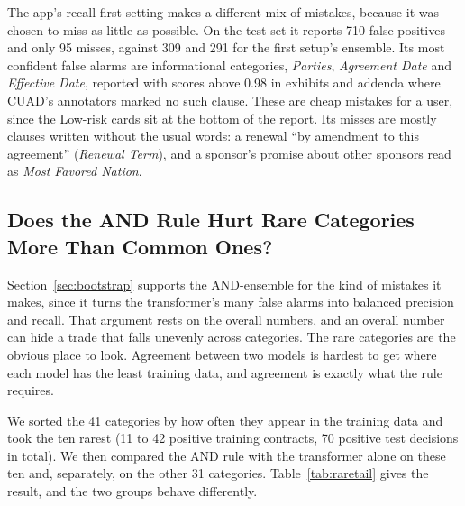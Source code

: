 The app's recall-first setting makes a different mix of mistakes, because it was chosen to miss as little as possible. On the test set it reports 710 false positives and only 95 misses, against 309 and 291 for the first setup's ensemble. Its most confident false alarms are informational categories, \emph{Parties}, \emph{Agreement Date} and \emph{Effective Date}, reported with scores above 0.98 in exhibits and addenda where CUAD's annotators marked no such clause. These are cheap mistakes for a user, since the Low-risk cards sit at the bottom of the report. Its misses are mostly clauses written without the usual words: a renewal ``by amendment to this agreement'' (\emph{Renewal Term}), and a sponsor's promise about other sponsors read as \emph{Most Favored Nation}.
\subsection{Does the AND Rule Hurt Rare Categories More Than Common Ones?}
\label{sec:raretail}
Section~\ref{sec:bootstrap} supports the AND-ensemble for the kind of mistakes it makes, since it turns the transformer's many false alarms into balanced precision and recall. That argument rests on the overall numbers, and an overall number can hide a trade that falls unevenly across categories. The rare categories are the obvious place to look. Agreement between two models is hardest to get where each model has the least training data, and agreement is exactly what the rule requires.

We sorted the 41 categories by how often they appear in the training data and took the ten rarest (11 to 42 positive training contracts, 70 positive test decisions in total). We then compared the AND rule with the transformer alone on these ten and, separately, on the other 31 categories. Table~\ref{tab:raretail} gives the result, and the two groups behave differently.

